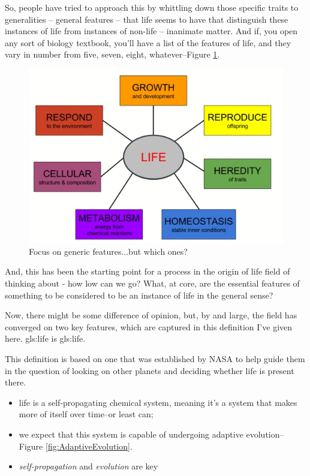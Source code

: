 \documentclass[]{article}
\begin{document}
So, people have tried to approach this by whittling down those specific traits
to generalities -- general features -- that life seems to have
that distinguish these instances of life from instances of non-life --
inanimate matter. And if, you open any sort of biology textbook, you'll have a list of the features of life, and they vary in number from five, seven, eight, whatever--Figure \ref{fig:lawki-focus}.

\begin{figure}[H]
	\caption{Focus on generic features...but which ones?}\label{fig:lawki-focus} 
	\includegraphics[width=\textwidth]{lawki-focus}
\end{figure}
And, this has been the starting point for a process in the origin of life field of thinking about - how low can we go? 
What, at core, are the essential features of something to be considered to be an instance of life in the general sense?

Now, there might be some difference of opinion, but, by and large, the field has converged on two key features, which are captured in this definition I've given here.
\gls{gls:life} is \glsdesc{gls:life}.

This definition is based on one that was established by NASA to help guide them in the question of looking on other planets and deciding whether life is present there.

\begin{itemize}
	\item life is a self-propagating chemical system, meaning it's a system that makes more of itself over time--or least can;
	\item  we expect  that this system 	is capable of undergoing
	adaptive evolution--Figure \ref{fig:AdaptiveEvolution}.
	\item \emph{self-propagation} and \emph{evolution} are key
\end{itemize}
\end{document}
